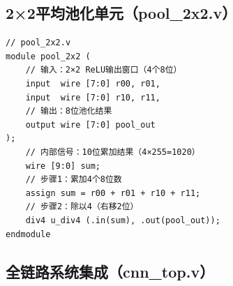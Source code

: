 \documentclass{ctexart}
\begin{document}
\subsection{2×2平均池化单元（pool\_2x2.v）}
\begin{lstlisting}[style=verilog, caption=pool\_2x2.v]
// pool_2x2.v
module pool_2x2 (
    // 输入：2×2 ReLU输出窗口（4个8位）
    input  wire [7:0] r00, r01,
    input  wire [7:0] r10, r11,
    // 输出：8位池化结果
    output wire [7:0] pool_out
);
    // 内部信号：10位累加结果（4×255=1020）
    wire [9:0] sum;
    // 步骤1：累加4个8位数
    assign sum = r00 + r01 + r10 + r11;
    // 步骤2：除以4（右移2位）
    div4 u_div4 (.in(sum), .out(pool_out));
endmodule
\end{lstlisting}

\subsection{全链路系统集成（cnn\_top.v）}
\end{document}

